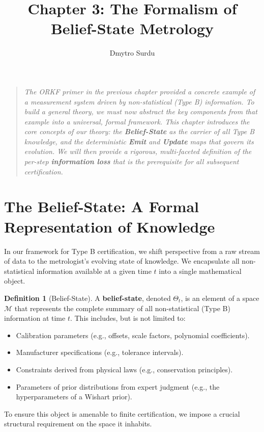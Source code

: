 \documentclass[12pt]{article}
\title{\textbf{Chapter 3: The Formalism of Belief-State Metrology}}
\author{Dmytro Surdu}
\date{}
\theoremstyle{definition}
\newtheorem{definition}{Definition}[section]
\theoremstyle{plain}
\begin{document}
\maketitle

\begin{quote}
\textit{The ORKF primer in the previous chapter provided a concrete example of a measurement system driven by non-statistical (Type B) information. To build a general theory, we must now abstract the key components from that example into a universal, formal framework. This chapter introduces the core concepts of our theory: the \textbf{Belief-State} as the carrier of all Type B knowledge, and the deterministic \textbf{Emit} and \textbf{Update} maps that govern its evolution. We will then provide a rigorous, multi-faceted definition of the per-step \textbf{information loss} that is the prerequisite for all subsequent certification.}
\end{quote}

\section{The Belief-State: A Formal Representation of Knowledge}

In our framework for Type B certification, we shift perspective from a raw stream of data to the metrologist's evolving state of knowledge. We encapsulate all non-statistical information available at a given time $t$ into a single mathematical object.

\begin{definition}[Belief-State]
\label{def:belief-state}
A \textbf{belief-state}, denoted $\Theta_t$, is an element of a space $\mathcal{M}$ that represents the complete summary of all non-statistical (Type B) information at time $t$. This includes, but is not limited to:
\begin{itemize}
    \item Calibration parameters (e.g., offsets, scale factors, polynomial coefficients).
    \item Manufacturer specifications (e.g., tolerance intervals).
    \item Constraints derived from physical laws (e.g., conservation principles).
    \item Parameters of prior distributions from expert judgment (e.g., the hyperparameters of a Wishart prior).
\end{itemize}
\end{definition}

To ensure this object is amenable to finite certification, we impose a crucial structural requirement on the space it inhabits.
\end{document}
